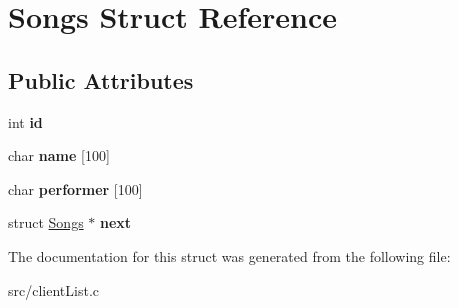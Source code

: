 \hypertarget{structSongs}{\section{Songs Struct Reference}
\label{structSongs}
}
\subsection*{Public Attributes}
\begin{DoxyCompactItemize}
\item 
\hypertarget{structSongs_a690e5658ee443ed8abe5a95d2080a7bc}{int {\bfseries id}}\label{structSongs_a690e5658ee443ed8abe5a95d2080a7bc}

\item 
\hypertarget{structSongs_afcf22500af6d1ce0afab083e4153392e}{char {\bfseries name} \mbox{[}100\mbox{]}}\label{structSongs_afcf22500af6d1ce0afab083e4153392e}

\item 
\hypertarget{structSongs_ab93e7555b94b5ed861f424e8cc5a3155}{char {\bfseries performer} \mbox{[}100\mbox{]}}\label{structSongs_ab93e7555b94b5ed861f424e8cc5a3155}

\item 
\hypertarget{structSongs_ac14c2e3bec07b7f68386301d29fc9004}{struct \hyperlink{structSongs}{Songs} $\ast$ {\bfseries next}}\label{structSongs_ac14c2e3bec07b7f68386301d29fc9004}

\end{DoxyCompactItemize}


The documentation for this struct was generated from the following file\-:\begin{DoxyCompactItemize}
\item 
src/client\-List.\-c\end{DoxyCompactItemize}
